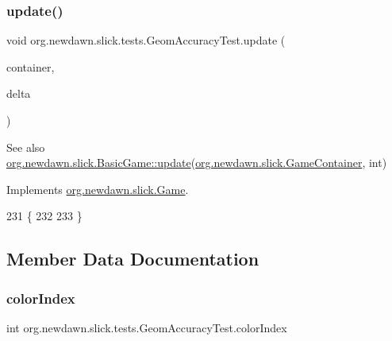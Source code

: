 \subsubsection{\texorpdfstring{update()}{update()}}
{\footnotesize\ttfamily void org.\+newdawn.\+slick.\+tests.\+Geom\+Accuracy\+Test.\+update (\begin{DoxyParamCaption}\item[{\mbox{\hyperlink{classorg_1_1newdawn_1_1slick_1_1_game_container}{Game\+Container}}}]{container,  }\item[{int}]{delta }\end{DoxyParamCaption})\hspace{0.3cm}{\ttfamily [inline]}}

\begin{DoxySeeAlso}{See also}
\mbox{\hyperlink{classorg_1_1newdawn_1_1slick_1_1_basic_game_acfe6fa05aef83bff1631af91a3e4bd20}{org.\+newdawn.\+slick.\+Basic\+Game\+::update}}(\mbox{\hyperlink{classorg_1_1newdawn_1_1slick_1_1_game_container}{org.\+newdawn.\+slick.\+Game\+Container}}, int) 
\end{DoxySeeAlso}


Implements \mbox{\hyperlink{interfaceorg_1_1newdawn_1_1slick_1_1_game_ab07b2e9463ee4631620dde0de25bdee8}{org.\+newdawn.\+slick.\+Game}}.


\begin{DoxyCode}
231                                                            \{
232         
233     \}
\end{DoxyCode}


\subsection{Member Data Documentation}
\mbox{\label{classorg_1_1newdawn_1_1slick_1_1tests_1_1_geom_accuracy_test_ab0114c968f3579a065cdf7304aeade3e}} 
\subsubsection{\texorpdfstring{color\+Index}{colorIndex}}
{\footnotesize\ttfamily int org.\+newdawn.\+slick.\+tests.\+Geom\+Accuracy\+Test.\+color\+Index\hspace{0.3cm}{\ttfamily [private]}}

